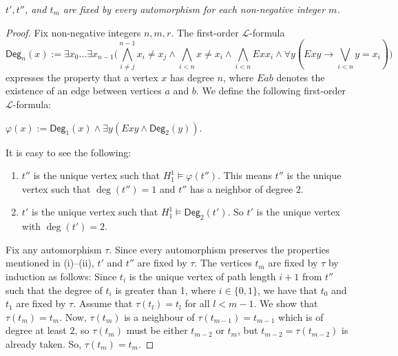 \documentclass[10pt,a4paper]{amsart}
\begin{document}
		\begin{claim}
			{\em $t', t''$, and $t_m$ are fixed by every automorphism for each non-negative integer $m$.}
		\end{claim}

		\begin{proof}
			Fix non-negative integers $n,m,r$. The first-order $\mathcal{L}$-formula
			\[ \mathsf{Deg}_n(x) := \exists x_0\dots \exists x_{n-1} \big(\bigwedge_{i\neq j}^{n-1}x_i\neq x_j\wedge  \bigwedge_{i<n}x\neq x_i \wedge \bigwedge_{i<n} Exx_i \wedge \forall y(Exy \to \bigvee_{i<n}y=x_i)\big)\]
			expresses the property that a vertex $x$ has degree $n$, where $Eab$ denotes the existence of an edge between vertices $a$ and $b$.  We define the following first-order $\mathcal{L}$-formula:
			
			\begin{flushleft}
				$\varphi(x) := \mathsf{Deg}_1(x)\wedge \exists y(Exy \wedge \mathsf{Deg}_2(y))$.
			\end{flushleft}
			
			It is easy to see the following:
			
			\begin{enumerate}
				\item[(i)] $t''$ is the unique vertex such that $H_1^1\models \varphi(t'')$. This means $t''$ is the unique vertex such that $\deg(t'')=1$ and $t''$ has a neighbor of degree $2$.
				\item[(ii)] $t'$ is the unique vertex such that $H_1^1\models  \mathsf{Deg}_2(t')$. So $t'$ is the unique vertex with $\deg(t')= 2$.
			\end{enumerate}
			Fix any automorphism $\tau$. Since every automorphism preserves the properties mentioned in (i)--(ii), $t'$ and $t''$ are fixed by $\tau$. 
			The vertices $t_{m}$ are fixed by $\tau$ by induction as follows: Since $t_{i}$ is the unique vertex of path length $i+1$ from $t''$ such that the degree of $t_{i}$ is greater than 1, where $i\in \{0,1\}$, we have that $t_{0}$ and $t_{1}$ are fixed by $\tau$.
			Assume that $\tau(t_{l})=t_{l}$ for all $l<m-1$. We show that $\tau(t_{m})=t_{m}$. Now, $\tau(t_{m})$ is a neighbour of $\tau(t_{m-1}) = t_{m-1}$ which is of degree at least $2$, so $\tau(t_{m})$ must be either $t_{m-2}$ or $t_{m}$, but $t_{m-2} = \tau(t_{m-2})$ is already taken. So, $\tau(t_{m})=t_{m}$.
		\end{proof}
\end{document}
